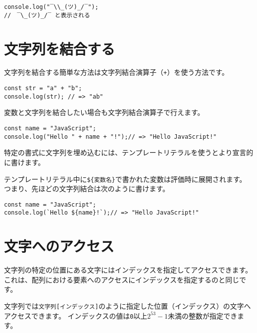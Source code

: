 \begin{lstlisting}
console.log("‾\\_(ツ)_/‾"); 
//　‾\_(ツ)_/‾ と表示される
\end{lstlisting}

\hypertarget{concat}{%
\section{文字列を結合する}\label{concat}}

文字列を結合する簡単な方法は文字列結合演算子（\texttt{+}）を使う方法です。

\begin{lstlisting}
const str = "a" + "b";
console.log(str); // => "ab"
\end{lstlisting}

変数と文字列を結合したい場合も文字列結合演算子で行えます。

\begin{lstlisting}
const name = "JavaScript";
console.log("Hello " + name + "!");// => "Hello JavaScript!"
\end{lstlisting}

特定の書式に文字列を埋め込むには、テンプレートリテラルを使うとより宣言的に書けます。

テンプレートリテラル中に\texttt{\$\{変数名\}}で書かれた変数は評価時に展開されます。
つまり、先ほどの文字列結合は次のように書けます。

\begin{lstlisting}
const name = "JavaScript";
console.log(`Hello ${name}!`);// => "Hello JavaScript!"
\end{lstlisting}

\hypertarget{get-char}{%
\section{文字へのアクセス}\label{get-char}}

文字列の特定の位置にある文字にはインデックスを指定してアクセスできます。
これは、配列における要素へのアクセスにインデックスを指定するのと同じです。

文字列では\texttt{文字列[インデックス]}のように指定した位置（インデックス）の文字へアクセスできます。
インデックスの値は\texttt{0}以上\texttt{$2^{53} - 1$}未満の整数が指定できます。

